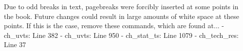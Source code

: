Due to odd breaks in text, pagebreaks were forcibly inserted at some points in the book. Future changes could result in large amounts of white space at these points. If this is the case, remove these commands, which are found at...
- ch_uvts: Line 382
- ch_uvts: Line 950
- ch_stat_ts: Line 1079
- ch_tech_res: Line 37
